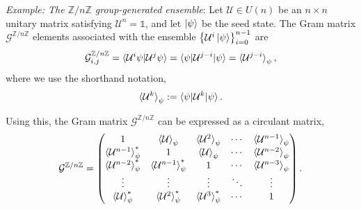 \documentclass[12pt,letterpaper]{article}
\begin{document}
\begin{multicols}{2}
\emph{Example: The $\mathbb{Z}/n\mathbb{Z}$ group-generated ensemble}: Let $\mathcal{U} \in U(n)$ be an $n \times n$ unitary matrix satisfying $\mathcal{U}^n = \mathds{1}$, and let $\ket{\psi}$ be the seed state. The Gram matrix $\mathcal{G}^{\mathbb{Z}/n\mathbb{Z}}$ elements associated with the ensemble $\left\{\mathcal{U}^i\ket{\psi}\right\}_{i=0}^{n-1}$ are
\begin{align*}
	\mathcal{G}^{\mathbb{Z}/n\mathbb{Z}}_{i,j} = \braket{\mathcal{U}^i\psi | \mathcal{U}^j\psi} = \braket{\psi | \mathcal{U}^{j-i} | \psi} = \braket{\mathcal{U}^{j-i}}_{\psi},
\end{align*}
where we use the shorthand notation,
\begin{align*}
	\braket{\mathcal{U}^k}_\psi := \braket{\psi | \mathcal{U}^k | \psi}.
\end{align*}

Using this, the Gram matrix $\mathcal{G}^{\mathbb{Z}/n\mathbb{Z}}$ can be expressed as a circulant matrix,
\begin{align*}
	\mathcal{G}^{\mathbb{Z}/n\mathbb{Z}} = \begin{pmatrix}
 1 & \braket{\mathcal{U}}_{\psi} & \braket{\mathcal{U}^2}_{\psi} & \cdots & \braket{\mathcal{U}^{n-1}}_{\psi} \\
 \braket{\mathcal{U}^{n-1}}_{\psi}^* & 1 & \braket{\mathcal{U}}_{\psi} & \cdots & \braket{\mathcal{U}^{n-2}}_{\psi} \\
 \braket{\mathcal{U}^{n-2}}_{\psi}^* & \braket{\mathcal{U}^{n-1}}_{\psi}^* & 1 & \cdots & \braket{\mathcal{U}^{n-3}}_{\psi} \\
 \vdots & \vdots & \vdots & \ddots & \vdots \\
 \braket{\mathcal{U}}_{\psi}^* & \braket{\mathcal{U}^{2}}_{\psi}^* & \braket{\mathcal{U}^{3}}_{\psi}^* & \cdots & 1
\end{pmatrix}.
\end{align*}


\end{multicols}
\end{document}
